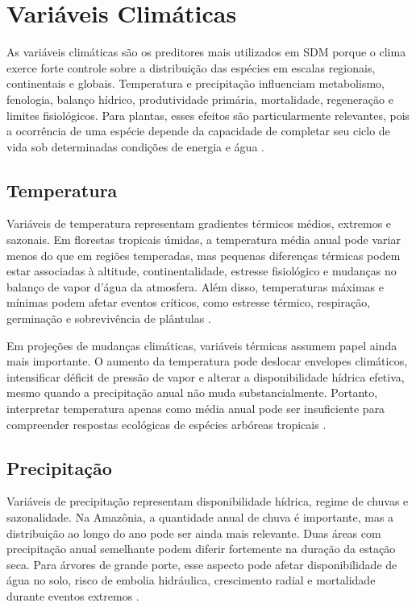 \section{Variáveis Climáticas}

As variáveis climáticas são os preditores mais utilizados em SDM porque o clima exerce forte controle sobre a distribuição das espécies em escalas regionais, continentais e globais. Temperatura e precipitação influenciam metabolismo, fenologia, balanço hídrico, produtividade primária, mortalidade, regeneração e limites fisiológicos. Para plantas, esses efeitos são particularmente relevantes, pois a ocorrência de uma espécie depende da capacidade de completar seu ciclo de vida sob determinadas condições de energia e água \parencite{woodward1987climate,franklin2010mapping}.

\subsection{Temperatura}

Variáveis de temperatura representam gradientes térmicos médios, extremos e sazonais. Em florestas tropicais úmidas, a temperatura média anual pode variar menos do que em regiões temperadas, mas pequenas diferenças térmicas podem estar associadas à altitude, continentalidade, estresse fisiológico e mudanças no balanço de vapor d’água da atmosfera. Além disso, temperaturas máximas e mínimas podem afetar eventos críticos, como estresse térmico, respiração, germinação e sobrevivência de plântulas \parencite{guisan2017habitat,booth2014bioclim}.

Em projeções de mudanças climáticas, variáveis térmicas assumem papel ainda mais importante. O aumento da temperatura pode deslocar envelopes climáticos, intensificar déficit de pressão de vapor e alterar a disponibilidade hídrica efetiva, mesmo quando a precipitação anual não muda substancialmente. Portanto, interpretar temperatura apenas como média anual pode ser insuficiente para compreender respostas ecológicas de espécies arbóreas tropicais \parencite{thuiller2004effects,zurell2020standard}.

\subsection{Precipitação}

Variáveis de precipitação representam disponibilidade hídrica, regime de chuvas e sazonalidade. Na Amazônia, a quantidade anual de chuva é importante, mas a distribuição ao longo do ano pode ser ainda mais relevante. Duas áreas com precipitação anual semelhante podem diferir fortemente na duração da estação seca. Para árvores de grande porte, esse aspecto pode afetar disponibilidade de água no solo, risco de embolia hidráulica, crescimento radial e mortalidade durante eventos extremos \parencite{nepstad2007amazon,phillips2009drought}.

